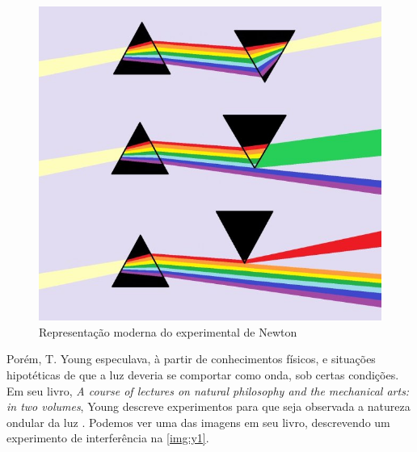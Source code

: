 \documentclass[
12pt,				%
openright,			%
oneside,			%
a4paper,			%
english,			%
french,				%
spanish,			%
brazil,				%
]{abntex2}
\begin{document}
\begin{figure}[!htb]
	\caption{\label{img:n2} Representação moderna do experimental de Newton}
	\begin{center}
	  \includegraphics[scale=0.3]{./imagens/n2.jpg}
	\end{center}
\end{figure}

\clearpage


Porém, T. Young especulava, à partir de conhecimentos físicos, e situações
hipotéticas de que a luz deveria se comportar como onda, sob certas condições.
Em seu livro, \textit{A course of lectures on natural philosophy and the mechanical
  arts: in two volumes}, Young descreve experimentos para que seja observada a
natureza ondular da luz \cite{young1807}. Podemos ver uma das imagens em seu
livro, descrevendo um experimento de interferência na \autoref{img:y1}.
\end{document}
